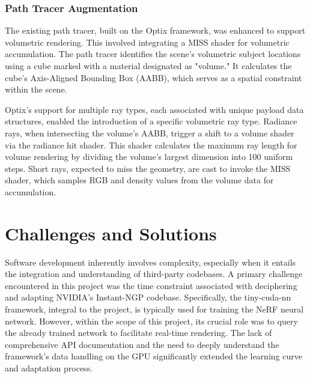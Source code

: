 \documentclass[conference]{IEEEtran}
\begin{document}
\subsubsection{Path Tracer Augmentation}

The existing path tracer, built on the Optix framework, was enhanced to support volumetric rendering. This involved integrating a MISS shader for volumetric accumulation. The path tracer identifies the scene's volumetric subject locations using a cube marked with a material designated as "volume." It calculates the cube’s Axis-Aligned Bounding Box (AABB), which serves as a spatial constraint within the scene.

Optix's support for multiple ray types, each associated with unique payload data structures, enabled the introduction of a specific volumetric ray type. Radiance rays, when intersecting the volume's AABB, trigger a shift to a volume shader via the radiance hit shader. This shader calculates the maximum ray length for volume rendering by dividing the volume's largest dimension into 100 uniform steps. Short rays, expected to miss the geometry, are cast to invoke the MISS shader, which samples RGB and density values from the volume data for accumulation\cite{OptixManual}.

\section{Challenges and Solutions}

Software development inherently involves complexity, especially when it entails the integration and understanding of third-party codebases. A primary challenge encountered in this project was the time constraint associated with deciphering and adapting NVIDIA's Instant-NGP codebase. Specifically, the tiny-cuda-nn framework, integral to the project, is typically used for training the NeRF neural network. However, within the scope of this project, its crucial role was to query the already trained network to facilitate real-time rendering. The lack of comprehensive API documentation and the need to deeply understand the framework's data handling on the GPU significantly extended the learning curve and adaptation process.
\end{document}
